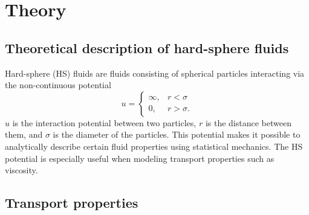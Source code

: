 \section{Theory}
\label{sec:theory}


\subsection{Theoretical description of hard-sphere fluids}
Hard-sphere (HS) fluids are fluids consisting of spherical particles 
interacting via the non-continuous potential 
\begin{equation}
    \label{eq:hard_sphere_potential}
    u = 
    \begin{cases}
        \infty, & r < \sigma \\
        0, & r > \sigma.
    \end{cases}
\end{equation}
$u$ is the interaction potential between two particles, 
$r$ is the distance between them, 
and $\sigma$ is the diameter of the particles.
This potential makes it possible to analytically describe 
certain fluid properties using statistical mechanics. 
The HS potential is especially useful when modeling 
transport properties such as viscosity.


\subsection{Transport properties}



